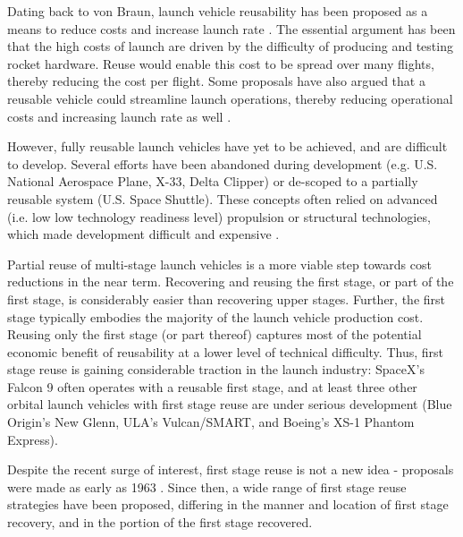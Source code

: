 \documentclass[conf]{new-aiaa}
\begin{document}
\begin{multicols}{2}
Dating back to von Braun, launch vehicle reusability has been proposed as a means to reduce costs and increase launch rate \cite{vonBraun52}. The essential argument has been that the high costs of launch are driven by the difficulty of producing and testing rocket hardware. Reuse would enable this cost to be spread over many flights, thereby reducing the cost per flight. Some proposals have also argued that a reusable vehicle could streamline launch operations, thereby reducing operational costs and increasing launch rate as well \cite{Butrica03}.

However, fully reusable launch vehicles have yet to be achieved, and are difficult to develop. Several efforts have been abandoned during development (e.g. U.S. National Aerospace Plane, X-33, Delta Clipper) or de-scoped to a partially reusable system (U.S. Space Shuttle). These concepts often relied on advanced (i.e. low low technology readiness level) propulsion or structural technologies, which made development difficult and expensive \cite{Butrica03}.

Partial reuse of multi-stage launch vehicles is a more viable step towards cost reductions in the near term. Recovering and reusing the first stage, or part of the first stage, is considerably easier than recovering upper stages. Further, the first stage typically embodies the majority of the launch vehicle production cost. Reusing only the first stage (or part thereof) captures most of the potential economic benefit of reusability at a lower level of technical difficulty. Thus, first stage reuse is gaining considerable traction in the launch industry: SpaceX's Falcon 9 often operates with a reusable first stage, and at least three other orbital launch vehicles with first stage reuse are under serious development (Blue Origin's New Glenn, ULA's Vulcan/SMART, and Boeing's XS-1 Phantom Express).

Despite the recent surge of interest, first stage reuse is not a new idea - proposals were made as early as 1963 \cite{Nexus, SeaDragon}. Since then, a wide range of first stage reuse strategies have been proposed, differing in the manner and location of first stage recovery, and in the portion of the first stage recovered.


\end{multicols}
\end{document}
